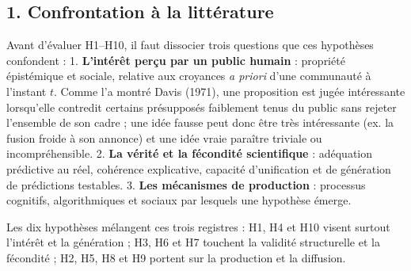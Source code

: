 \documentclass[a4paper,11pt]{article}
\begin{document}
\subsection*{1. Confrontation à la littérature}

Avant d'évaluer H1--H10, il faut dissocier trois questions que ces
hypothèses confondent : 1. \textbf{L'intérêt perçu par un public humain}
: propriété épistémique et sociale, relative aux croyances \emph{a
priori} d'une communauté à l'instant \(t\). Comme l'a montré Davis
(1971), une proposition est jugée intéressante lorsqu'elle contredit
certains présupposés faiblement tenus du public sans rejeter l'ensemble
de son cadre ; une idée fausse peut donc être très intéressante (ex. la
fusion froide à son annonce) et une idée vraie paraître triviale ou
incompréhensible. 2. \textbf{La vérité et la fécondité scientifique} :
adéquation prédictive au réel, cohérence explicative, capacité
d'unification et de génération de prédictions testables. 3. \textbf{Les
mécanismes de production} : processus cognitifs, algorithmiques et
sociaux par lesquels une hypothèse émerge.

Les dix hypothèses mélangent ces trois registres : H1, H4 et H10 visent
surtout l'intérêt et la génération ; H3, H6 et H7 touchent la validité
structurelle et la fécondité ; H2, H5, H8 et H9 portent sur la
production et la diffusion.
\end{document}
